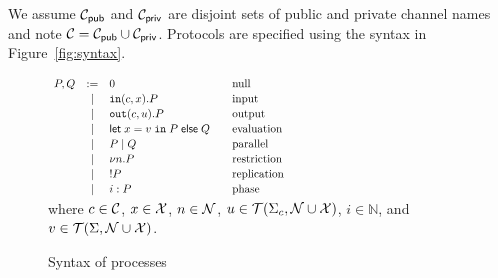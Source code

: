 
\label{subsec:procalg}

We assume $\mathcal{C}_{\mathsf{pub}}$ and $\mathcal{C}_{\mathsf{priv}}$ are disjoint sets of public and private channel
names and note $\mathcal{C}=\mathcal{C}_{\mathsf{pub}}\cup\mathcal{C}_{\mathsf{priv}}$. %
Protocols are specified using the 
syntax in Figure~\ref{fig:syntax}.


 \begin{figure}[t]
   \null\hfill
   $\scalemath{0.8}{
  \begin{array}{rclcl}
    P,Q &:=&  0 & & \mbox{null}\\[0.5mm]
    &\mid & \In(c, x).P && \mbox{input}\\[0.5mm]
    &\mid&\Out(c, u).P &&\mbox{output} \\[0.5mm]
    &\mid& \Let \; x = v \;\In \; P \; \Else \; Q&&
    \mbox{evaluation}\\[0.5mm]
    &\; \mid \; & P \mid Q&&\mbox{parallel}\\[0.5mm]
    &\mid& \new n. P && \mbox{restriction} \\[0.5mm]
    &\mid&  !P && \mbox{replication} \\[0.5mm]
    &\mid&  \phase{i} P && \mbox{phase} \\[0.5mm]
  \end{array} 
  }$\hfill\null\\
  where $c \in \mathcal{C}$, $x \in \mathcal{X}$, $n \in \mathcal{N}$, $u \in \mathcal{T}(\Sigma_c, \mathcal{N}
  \cup \mathcal{X})$, $i\in\mathbb{N}$,
  and $v\in\mathcal{T}(\Sigma, \mathcal{N}\cup\mathcal{X})$.
  \caption{Syntax of processes}
 \label{fig:app:syntax}
 \end{figure}

